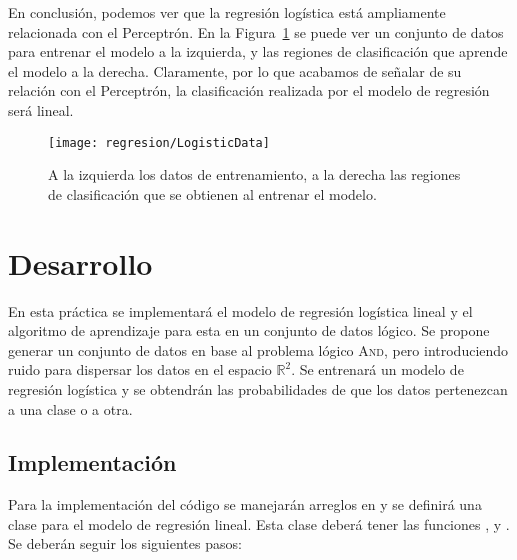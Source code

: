 En conclusión, podemos ver que la regresión logística está ampliamente relacionada con el Perceptrón. En la Figura~\ref{Fig:LogistData} se puede ver un conjunto de datos para entrenar el modelo a la izquierda, y las regiones de clasificación que aprende el modelo a la derecha. Claramente, por lo que acabamos de señalar de su relación con el Perceptrón, la clasificación realizada por el modelo de regresión será lineal.

\begin{figure}
 \centering
 \texttt{[image: regresion/LogisticData]}
 \caption{A la izquierda los datos de entrenamiento, a la derecha las regiones de clasificación que se obtienen al entrenar el modelo.}\label{Fig:LogistData}
\end{figure}






\section{Desarrollo}

En esta práctica se implementará el modelo de regresión logística lineal y el algoritmo de aprendizaje para esta en un conjunto de datos lógico. Se propone generar un conjunto de datos en base al problema lógico \textsc{And}, pero introduciendo ruido para dispersar los datos en el espacio $\mathbb{R}^2$. Se entrenará un modelo de regresión logística y se obtendrán las probabilidades de que los datos pertenezcan a una clase o a otra.



\subsection{Implementación}

Para la implementación del código se manejarán arreglos en  y se definirá una clase para el modelo de regresión lineal. Esta clase deberá tener las funciones ,  y . Se deberán seguir los siguientes pasos:


